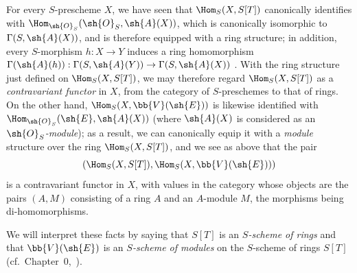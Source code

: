 \begin{env}[1.7.13]
\label{II.1.7.13}
For every $S$-prescheme $X$, we have seen  that $\Hom_S(X,S[T])$ canonically identifies with $\Hom_{\sh{O}_S}(\sh{O}_S,\sh{A}(X))$, which is canonically isomorphic to $\Gamma(S,\sh{A}(X))$, and is therefore equipped with a ring structure; in addition, every $S$-morphism $h:X\to Y$ induces a ring homomorphism $\Gamma(\sh{A}(h)):\Gamma(S,\sh{A}(Y))\to\Gamma(S,\sh{A}(X))$ .
With the ring structure just defined on $\Hom_S(X,S[T])$, we may therefore regard $\Hom_S(X,S[T])$ as a \emph{contravariant functor} in $X$, from the category of $S$-preschemes to that of rings.
On the other hand, $\Hom_S(X,\bb{V}(\sh{E}))$ is likewise identified with $\Hom_{\sh{O}_S}(\sh{E},\sh{A}(X))$ (where $\sh{A}(X)$ is considered as an \emph{$\sh{O}_S$-module});
as a result, we can canonically equip it with a \emph{module} structure over the ring $\Hom_S(X,S[T])$, and we see as above that the pair
\[
  (\Hom_S(X,S[T]),\Hom_S(X,\bb{V}(\sh{E})))
\]
is a contravariant functor in $X$, with values in the category whose objects are the pairs $(A,M)$ consisting of a ring $A$ and an $A$-module $M$, the morphisms being di-homomorphisms.

We will interpret these facts by saying that $S[T]$ is an \emph{$S$-scheme of rings} and that $\bb{V}(\sh{E})$ is an \emph{$S$-scheme of modules} on the $S$-scheme of rings $S[T]$ (cf.~Chapter~0,~).
\end{env}

